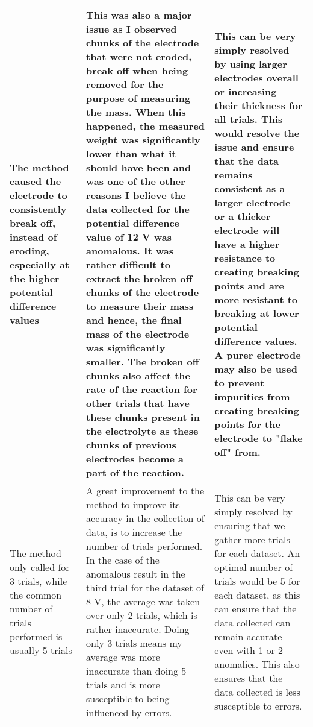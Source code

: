 \documentclass[11pt, a4]{article}
\begin{document}
\begin{small}
\begin{longtable}{|m{3.5cm}|m{7cm}|m{4.7cm}|}
					\hline
					
					The method caused the electrode to consistently break off, instead of eroding, especially at the higher potential difference values &
					This was also a major issue as I observed chunks of the electrode that were not eroded, break off when being removed for the purpose of measuring the mass. When this happened, the measured weight was significantly lower than what it should have been and was one of the other reasons I believe the data collected for the potential difference value of 12 V was anomalous. It was rather difficult to extract the broken off chunks of the electrode to measure their mass and hence, the final mass of the electrode was significantly smaller. The broken off chunks also affect the rate of the reaction for other trials that have these chunks present in the electrolyte as these chunks of previous electrodes become a part of the reaction. &
					This can be very simply resolved by using larger electrodes overall or increasing their thickness for all trials. This would resolve the issue and ensure that the data remains consistent as a larger electrode or a thicker electrode will have a higher resistance to creating breaking points and are more resistant to breaking at lower potential difference values. A purer electrode may also be used to prevent impurities from creating breaking points for the electrode to "flake off" from.\\
					
					\hline
					
					The method only called for 3 trials, while the common number of trials performed is usually 5 trials &
					A great improvement to the method to improve its accuracy in the collection of data, is to increase the number of trials performed. In the case of the anomalous result in the third trial for the dataset of 8 V, the average was taken over only 2 trials, which is rather inaccurate. Doing only 3 trials means my average was more inaccurate than doing 5 trials and is more susceptible to being influenced by errors. &
					This can be very simply resolved by ensuring that we gather more trials for each dataset. An optimal number of trials would be 5 for each dataset, as this can ensure that the data collected can remain accurate even with 1 or 2 anomalies. This also ensures that the data collected is less susceptible to errors.\\
					
					\hline
					

\end{longtable}
\end{small}
\end{document}
